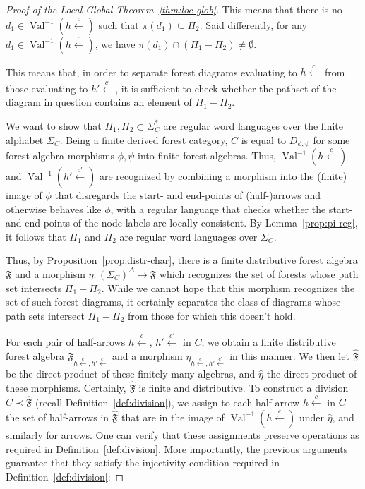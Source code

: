 \documentclass[sigplan,9pt]{acmart}\settopmatter{printfolios=true,printccs=false,printacmref=false}
\newcounter{thm}
\theoremstyle{definition}
\newcommand{\Ff}[0]{{\mathfrak{F}}}
\newcommand{\carrow}[3]{#3 \xleftarrow{#2} #1 }
\begin{document}
\begin{proof}[Proof of the Local-Global Theorem~\ref{thm:loc-glob}]
This means that there is no $d_1 \in \operatorname{Val}^{-1}(\carrow{}{c}h)$ such that $\pi(d_1) \subseteq \Pi_2$.
Said differently, for any $d_1 \in \operatorname{Val}^{-1}(\carrow{}{c}h)$, we have $\pi(d_1) \cap (\Pi_1-\Pi_2) \neq \emptyset$.

This means that, in order to separate forest diagrams evaluating to $\carrow{}{c}h$ from those evaluating to $\carrow{}{c'}{h'}$, it is sufficient to check whether the pathset of the diagram in question contains an element of $\Pi_1-\Pi_2$.

We want to show that $\Pi_1, \Pi_2 \subset \Sigma_C^*$ are regular word languages over the finite alphabet $\Sigma_C$.
Being a finite derived forest category, $C$ is equal to $D_{\phi ,\psi}$ for some forest  algebra morphisms $\phi, \psi$ into finite forest algebras.
Thus, $\operatorname{Val}^{-1}(\carrow{}{c}h)$ and $\operatorname{Val}^{-1}(\carrow{}{c'}{h'})$ are recognized by combining a morphism into the (finite) image of $\phi$ that disregards the start- and end-points of (half-)arrows and otherwise behaves like $\phi$, with a regular language that checks whether the start- and end-points of the node labels are locally consistent.
By Lemma~\ref{prop:pi-reg}, it follows that $\Pi_1$ and $\Pi_2$ are regular word languages over $\Sigma_C$.

Thus, by Proposition~\ref{prop:distr-char}, there is a finite distributive forest algebra $\Ff$ and a morphism $\eta : (\Sigma_C)^\Delta \rightarrow \Ff$ which recognizes the set of forests whose path set intersects $\Pi_1-\Pi_2$.
While we cannot hope that this morphism recognizes the set of such forest diagrams, it certainly separates the class of diagrams whose path sets intersect $\Pi_1-\Pi_2$ from those for which this doesn't hold.

For each pair of half-arrows $\carrow{}{c}h$, $\carrow{}{c'}{h'}$ in $C$, we obtain a finite distributive forest algebra $\Ff_{\carrow{}{c}h, \carrow{}{c'}{h'}}$ and a morphism $\eta_{\carrow{}{c}h, \carrow{}{c'}{h'}}$ in this manner.
We then let $\widehat{\Ff}$ be the direct product of these finitely many algebras, and $\widehat{\eta}$ the direct product of these morphisms.
Certainly, $\widehat{\Ff}$ is finite and distributive.
To construct a division $C \prec \widehat{\Ff}$ (recall Definition~\ref{def:division}), we assign to each half-arrow 
$\carrow{}{c}h$ in $C$ the set of half-arrows in $\widehat{\Ff}$ that are in the image of $\operatorname{Val}^{-1}(\carrow{}{c}h)$ under $\widehat{\eta}$, and similarly for arrows.
One can verify that these assignments preserve operations as required in Definition~\ref{def:division}.
More importantly, the previous arguments guarantee that they satisfy the injectivity condition required in Definition~\ref{def:division}:


\end{proof}
\end{document}
